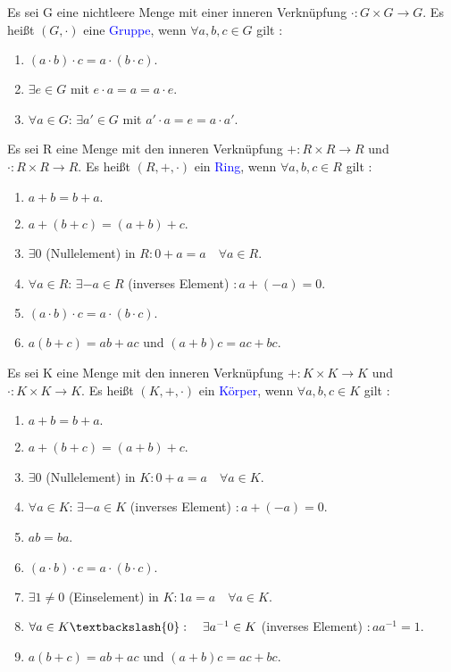 \begin{definition}
Es sei G eine nichtleere Menge mit einer inneren Verknüpfung $\cdot : G \times G \rightarrow G$. Es heißt $(G,\cdot)$ eine \textcolor{blue}{Gruppe}, wenn $\forall a,b,c \in G$ gilt \cite{Karpfinger}: 
\begin{enumerate}
\item $(a \cdot b) \cdot c = a \cdot ( b \cdot c ).$
\item $\exists e \in G$ mit $ e \cdot a = a = a \cdot e. $
\item $\forall a \in G :\,\exists a' \in G $ mit $ a' \cdot a = e = a \cdot a'.$
\end{enumerate}
\end{definition}


\begin{definition}
Es sei R eine Menge mit den inneren Verknüpfung $+ : R \times R \rightarrow R$ und $\cdot : R \times R \rightarrow R$. Es heißt $(R,+,\cdot)$ ein \textcolor{blue}{Ring}, wenn $\forall a,b,c \in R$ gilt \cite{Karpfinger}: 
\begin{enumerate}
\item $a+b=b+a.$
\item $a+(b+c)=(a+b)+c$.
\item $\exists 0 $ (Nullelement) in $ R : 0+a= a \quad \forall a \in R$.
\item $\forall a \in R :\,\exists -a \in R$ (inverses Element) $: a + (-a) = 0$.
\item $(a \cdot b) \cdot c = a \cdot ( b \cdot c ).$
\item $a(b+c)=ab+ac$ und $(a+b)c = ac+bc$.
\end{enumerate}
\end{definition}

\begin{definition}
Es sei K eine Menge mit den inneren Verknüpfung $+ : K \times K \rightarrow K$ und $\cdot : K \times K \rightarrow K$. Es heißt $(K,+,\cdot)$ ein \textcolor{blue}{Körper}, wenn $\forall a,b,c \in K$ gilt \cite{Karpfinger}: 
\begin{enumerate}
\item $a+b=b+a.$
\item $a+(b+c)=(a+b)+c$.
\item $\exists 0 $ (Nullelement) in $ K : 0+a= a \quad \forall a \in K$.
\item $\forall a \in K :\,\exists -a \in K$ (inverses Element) $: a + (-a) = 0$.
\item $ab=ba$.
\item $(a \cdot b) \cdot c = a \cdot ( b \cdot c ).$
\item $\exists 1 \neq 0$ (Einselement) in $ K: 1a=a \quad \forall a \in K$.
\item $\forall a \in K \textbackslash \{ 0 \} :\quad \exists a^{-1}\in K $ (inverses Element) $: aa^{-1}=1.$
\item $a(b+c)=ab+ac$ und $(a+b)c = ac+bc$.
\end{enumerate}
\end{definition}

